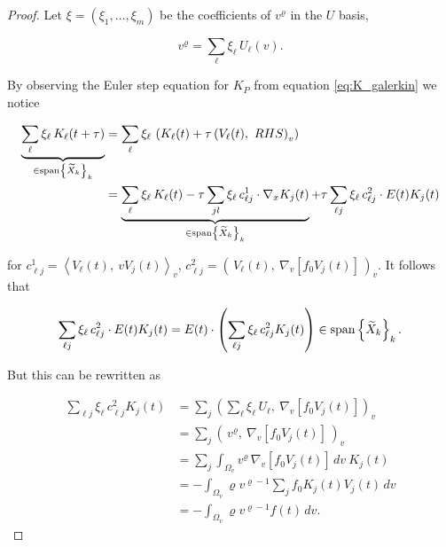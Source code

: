 \begin{proof}
    Let $\xi = \left( \xi_1, \ldots, \xi_m \right)$ be the coefficients of $v^\varrho$ 
    in the $U$ basis,

    \begin{equation}
        v^\varrho = \sum_\ell \xi_\ell\, U_\ell (v) . 
    \end{equation}

    By observing the Euler step equation for $K_P$ from equation 
    \ref{eq:K_galerkin} we notice

    \begin{equation}
        \begin{split}
            \underbrace{
                \sum_\ell \xi_\ell\, K_\ell (t + \tau)
            }_{
                \in \text{span} \left\{ \widetilde{ X }_k \right\}_k
            } 
            &= \sum_\ell \xi_\ell\, \left( 
                K_\ell (t) + \tau \left( V_\ell (t),\ RHS \right)_v 
            \right) \\
            &= \underbrace{
                    \sum_\ell \xi_\ell\, K_\ell (t) 
                    - \tau \sum_{j l} \xi_\ell\, c^1_{\ell j} \cdot \nabla_x K_j (t)
                }_{
                    \in \text{span} \left\{ \widetilde{ X }_k \right\}_k
                } 
                + \tau \sum_{\ell j} \xi_\ell\, c^2_{\ell j} \cdot E(t) K_j (t) 
        \end{split}
    \end{equation}

    for $c^1_{\ell j} = \left\langle V_\ell (t),\ vV_j (t) \right\rangle_v$, 
    $c^2_{\ell j} = \left(\, V_\ell (t),\ \nabla_v \left[ f_0 V_j (t) \right] \,\right)_v$. It follows 
    that 

    \begin{equation}
        \sum_{\ell j} \xi_\ell\, c^2_{\ell j} \cdot E(t) K_j (t) 
        = E(t) \cdot \left( \sum_{\ell j} \xi_\ell\, c^2_{\ell j} K_j (t) \right) 
        \in \text{span} \left\{ \widetilde{ X }_k \right\}_k . 
    \end{equation}

    But this can be rewritten as 

    \begin{equation}
        \begin{split}
            \sum_{\ell j} \xi_\ell\, c^2_{\ell j} K_j (t) 
            &= \sum_j \left( 
                \sum_\ell \xi_\ell\, U_\ell,\ 
                \nabla_v \left[ f_0 V_j (t) \right] 
            \right)_v \\
            &= \sum_j \left(\, v^\varrho,\ \nabla_v \left[ f_0 V_j (t) \right] \,\right)_v \\
            &= \sum_j \int_{\Omega_v} 
                v^\varrho\, 
                \nabla_v \left[ f_0 V_j (t) \right] \,dv\ 
                K_j (t) \\
            &= - \int_{\Omega_v} \varrho v^{\varrho - 1} \sum_j f_0 K_j (t) V_j (t) \,dv \\
            &= - \int_{\Omega_v} \varrho v^{\varrho - 1} f (t) \,dv . 
        \end{split}
    \end{equation}
\end{proof}
\fi


